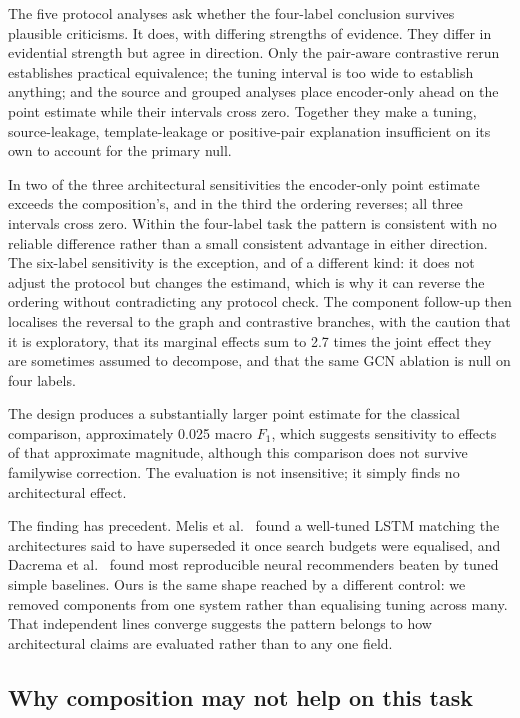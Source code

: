 \documentclass[11pt,a4paper]{article}
\begin{document}
The five protocol analyses ask whether the four-label conclusion survives plausible criticisms. It does, with differing strengths of evidence. They differ in evidential strength but agree in direction. Only the pair-aware contrastive rerun
establishes practical equivalence; the tuning interval is too wide to establish anything; and the source
and grouped analyses place encoder-only ahead on the point estimate while their intervals cross zero.
Together they make a tuning, source-leakage, template-leakage or positive-pair explanation insufficient on
its own to account for the primary null.

In two of the three architectural sensitivities the encoder-only point estimate exceeds the composition's,
and in the third the ordering reverses; all three intervals cross zero. Within the four-label task the
pattern is consistent with no reliable difference rather than a small consistent advantage in either
direction. The six-label sensitivity is the exception, and of a different kind: it does not adjust the protocol but
changes the estimand, which is why it can reverse the ordering without contradicting any protocol check.
The component follow-up then localises the reversal to the graph and contrastive branches, with the
caution that it is exploratory, that its marginal effects sum to 2.7 times the joint effect they are
sometimes assumed to decompose, and that the same GCN ablation is null on four labels.

The design produces a substantially larger point estimate for the classical comparison, approximately
0.025 macro $F_1$, which suggests sensitivity to effects of that approximate magnitude, although this
comparison does not survive familywise correction. The
evaluation is not insensitive; it simply finds no architectural effect.

The finding has precedent. Melis et al.~\cite{melis2018} found a well-tuned LSTM matching the architectures said to have superseded it once search budgets were equalised, and Dacrema et al.~\cite{dacrema2019} found most reproducible neural recommenders beaten by tuned simple baselines. Ours is the same shape reached by a different control: we removed components from one system rather than equalising tuning across many. That independent lines converge suggests the pattern belongs to how architectural claims are evaluated rather than to any one field.

\subsection{Why composition may not help on this task}
\end{document}
